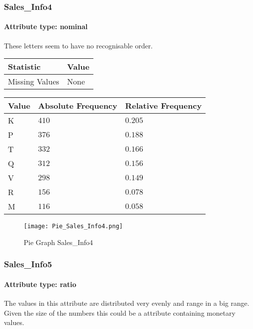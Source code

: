 \subsubsection{Sales\_Info4}
\paragraph{Attribute type: nominal} These letters seem to have no recognisable order.

\begin{table}[H]
	\renewcommand{\arraystretch}{1.25}
	\begin{tabular}{l|l}
		\textbf{Statistic} & \textbf{Value}\\\hline
		Missing Values& None\\\hline
	\end{tabular}
\end{table}
\begin{table}[H]
	\renewcommand{\arraystretch}{1.25}
	\begin{tabular}{l|l|l}
		\textbf{Value} & \textbf{Absolute Frequency} & \textbf{Relative Frequency}\\\hline
		K&$410$&$0.205$\\\hline
		P&$376$&$0.188$\\\hline
		T&$332$&$0.166$\\\hline
		Q&$312$&$0.156$\\\hline
		V&$298$&$0.149$\\\hline
		R&$156$&$0.078$\\\hline
		M&$116$&$0.058$
	\end{tabular}
\end{table}

\begin{figure}[H]
	\begin{center}
		\texttt{[image: Pie\_Sales\_Info4.png]}
	\end{center}
	\caption{Pie Graph Sales\_Info4}
\end{figure}

\subsubsection{Sales\_Info5}
\paragraph{Attribute type: ratio} The values in this attribute are distributed very evenly and range in a big range. Given the size of the numbers this could be a attribute containing monetary values.

